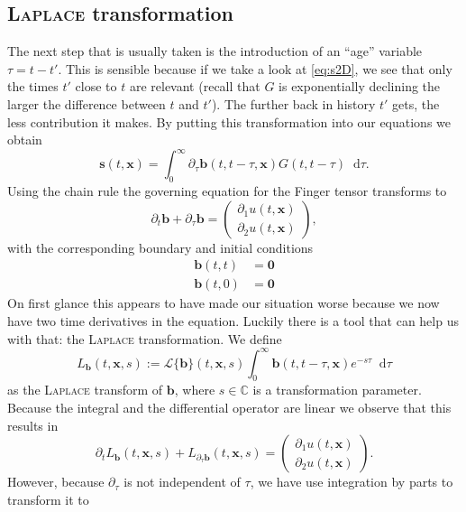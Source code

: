 \documentclass[12pt,a4paper]{scrartcl}
\numberwithin{equation}{section} %
\theoremstyle{definition}
\theoremstyle{plain}
\newcommand{\cc}{\mathbb{C}}
\newcommand{\bfb}{\bm{b}}
\newcommand{\bfs}{\bm{s}}
\newcommand{\bfx}{\bm{x}}
\newcommand{\D}{\mathop{}\!\mathrm{d}}
\begin{document}
\subsection{\textsc{Laplace} transformation}
The next step that is usually taken is the introduction of an \enquote{age} variable $\tau=t-t'$. This is sensible because if we take a look at \eqref{eq:s2D}, we see that only the times $t'$ close to $t$ are relevant (recall that $G$ is exponentially declining the larger the difference between $t$ and $t'$). The further back in history $t'$ gets, the less contribution it makes. By putting this transformation into our equations we obtain
\begin{equation}
    \bfs(t,\bfx)=\int_0^\infty\partial_\tau\bfb(t,t-\tau,\bfx)G(t,t-\tau)\D\tau.\label{eq:sage}
\end{equation}
Using the chain rule the governing equation for the Finger tensor transforms to  
\begin{equation}
    \partial_t \bfb +\partial_\tau\bfb = \begin{pmatrix}
    \partial_1 u(t,\bfx)\\\partial_2 u(t,\bfx)
    \end{pmatrix},
\end{equation}
with the corresponding boundary and initial conditions
\begin{align}
    \bfb(t,t) &= \bm{0}\\
    \bfb(t,0) &= \bm{0}
\end{align}
On first glance this appears to have made our situation worse because we now have two time derivatives in the equation. Luckily there is a tool that can help us with that: the \textsc{Laplace} transformation. We define
\begin{equation}
L_{\bfb}(t,\bfx,s) := \mathcal{L}\{\bfb\}(t,\bfx,s) \int_0^\infty\bfb(t,t-\tau,\bfx)e^{-s\tau}\D\tau
\end{equation}
as the \textsc{Laplace} transform of $\bfb$, where $s\in\cc$ is a transformation parameter. 
Because the integral and the differential operator are linear we observe that this results in
\begin{equation}
    \partial_tL_{\bfb}(t,\bfx,s) + L_{\partial_\tau\bfb}(t,\bfx,s) = \begin{pmatrix}
    \partial_1 u(t,\bfx)\\\partial_2 u(t,\bfx)
    \end{pmatrix}.
\end{equation}
However, because $\partial_\tau$ is not independent of $\tau$, we have use integration by parts to transform it to
\end{document}
